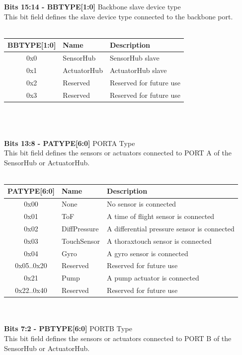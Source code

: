 \textbf{Bits 15:14 - BBTYPE[1:0]} Backbone slave device type\\
This bit field defines the slave device type connected to the backbone port.\\\\
\begin{tabular}{|c|l|l|}
\hline
   BBTYPE[1:0]  &  Name & Description\\ \hline
    0x0 &  SensorHub & SensorHub slave\\ \hline
    0x1 & ActuatorHub & ActuatorHub slave\\ \hline
    0x2 & Reserved & Reserved for future use\\ \hline
    0x3 & Reserved & Reserved for future use\\
\hline
\end{tabular}\\\\\\
\textbf{Bits 13:8 - PATYPE[6:0]} PORTA Type\\
This bit field defines the sensors or actuators connected to PORT A of the SensorHub or
ActuatorHub.\\\\
\begin{tabular}{|c|l|l|}
    \hline
    PATYPE[6:0] & Name & Description \\ \hline
    0x00 & None & No sensor is connected\\ \hline
    0x01 & ToF & A time of flight sensor is connected\\ \hline
    0x02 & DiffPressure & A differential pressure sensor is connected\\ \hline
    0x03 & TouchSensor & A thoraxtouch sensor is connected\\ \hline
    0x04 & Gyro & A gyro sensor is connected\\ \hline
    0x05..0x20 & Reserved & Reserved for future use\\ \hline
    0x21 & Pump & A pump actuator is connected\\ \hline
    0x22..0x40 & Reserved & Reserved for future use \\ \hline
\end{tabular}
\\\\
\textbf{Bits 7:2 - PBTYPE[6:0]} PORTB Type\\
This bit field defines the sensors or actuators connected to PORT B of the SensorHub or
ActuatorHub.\\\\
